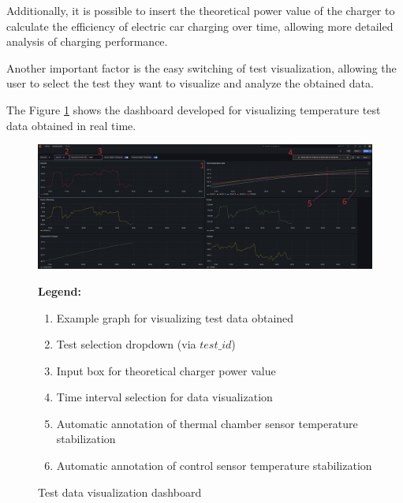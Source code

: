 Additionally, it is possible to insert the theoretical power value of the charger to calculate the efficiency of electric car charging over time, allowing more detailed analysis of charging performance.

Another important factor is the easy switching of test visualization, allowing the user to select the test they want to visualize and analyze the obtained data. 

The Figure \ref{fig:dashboard} shows the dashboard developed for visualizing temperature test data obtained in real time.

\begin{figure}[H]
    \centering
    \begin{minipage}{0.8\textwidth}
        \includegraphics[width=\linewidth]{figures/dashboard.png}
    \end{minipage}
    \caption{Test data visualization dashboard}
    \label{fig:dashboard}
    
    \vspace{0.5em}
    \begin{minipage}{0.95\textwidth}
        \small
        \textbf{Legend:}
        \begin{enumerate}
            \item Example graph for visualizing test data obtained
            \item Test selection dropdown (via $test\_id$)
            \item Input box for theoretical charger power value
            \item Time interval selection for data visualization
            \item Automatic annotation of thermal chamber sensor temperature stabilization
            \item Automatic annotation of control sensor temperature stabilization
        \end{enumerate}
    \end{minipage}
\end{figure}

